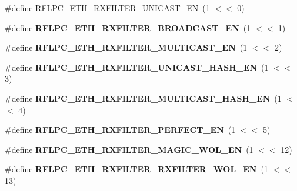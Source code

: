 \begin{DoxyCompactItemize}
\item 
\#define \hyperlink{group__eth_gac3ecd67e6b6b684239e341481ec36584}{R\-F\-L\-P\-C\-\_\-\-E\-T\-H\-\_\-\-R\-X\-F\-I\-L\-T\-E\-R\-\_\-\-U\-N\-I\-C\-A\-S\-T\-\_\-\-E\-N}~(1 $<$$<$ 0)
\item 
\hypertarget{group__eth_ga5e414e2d92196860d74a5349574362d1}{\#define {\bfseries R\-F\-L\-P\-C\-\_\-\-E\-T\-H\-\_\-\-R\-X\-F\-I\-L\-T\-E\-R\-\_\-\-B\-R\-O\-A\-D\-C\-A\-S\-T\-\_\-\-E\-N}~(1 $<$$<$ 1)}\label{group__eth_ga5e414e2d92196860d74a5349574362d1}

\item 
\hypertarget{group__eth_ga0adeccaba7cb9a75c9b79175c0e6c64e}{\#define {\bfseries R\-F\-L\-P\-C\-\_\-\-E\-T\-H\-\_\-\-R\-X\-F\-I\-L\-T\-E\-R\-\_\-\-M\-U\-L\-T\-I\-C\-A\-S\-T\-\_\-\-E\-N}~(1 $<$$<$ 2)}\label{group__eth_ga0adeccaba7cb9a75c9b79175c0e6c64e}

\item 
\hypertarget{group__eth_ga9234646da71dbef8ffdefcd6bbef48dd}{\#define {\bfseries R\-F\-L\-P\-C\-\_\-\-E\-T\-H\-\_\-\-R\-X\-F\-I\-L\-T\-E\-R\-\_\-\-U\-N\-I\-C\-A\-S\-T\-\_\-\-H\-A\-S\-H\-\_\-\-E\-N}~(1 $<$$<$ 3)}\label{group__eth_ga9234646da71dbef8ffdefcd6bbef48dd}

\item 
\hypertarget{group__eth_gab28e59a7ad7b7f29ae109b6690ad7ac9}{\#define {\bfseries R\-F\-L\-P\-C\-\_\-\-E\-T\-H\-\_\-\-R\-X\-F\-I\-L\-T\-E\-R\-\_\-\-M\-U\-L\-T\-I\-C\-A\-S\-T\-\_\-\-H\-A\-S\-H\-\_\-\-E\-N}~(1 $<$$<$ 4)}\label{group__eth_gab28e59a7ad7b7f29ae109b6690ad7ac9}

\item 
\hypertarget{group__eth_gac8a57f58a6bcd2990b21f931badb925f}{\#define {\bfseries R\-F\-L\-P\-C\-\_\-\-E\-T\-H\-\_\-\-R\-X\-F\-I\-L\-T\-E\-R\-\_\-\-P\-E\-R\-F\-E\-C\-T\-\_\-\-E\-N}~(1 $<$$<$ 5)}\label{group__eth_gac8a57f58a6bcd2990b21f931badb925f}

\item 
\hypertarget{group__eth_ga4d4363c80a0ef534743be34f12ad2432}{\#define {\bfseries R\-F\-L\-P\-C\-\_\-\-E\-T\-H\-\_\-\-R\-X\-F\-I\-L\-T\-E\-R\-\_\-\-M\-A\-G\-I\-C\-\_\-\-W\-O\-L\-\_\-\-E\-N}~(1 $<$$<$ 12)}\label{group__eth_ga4d4363c80a0ef534743be34f12ad2432}

\item 
\hypertarget{group__eth_gaa93a63f943f0bd393e06f9ee938a2069}{\#define {\bfseries R\-F\-L\-P\-C\-\_\-\-E\-T\-H\-\_\-\-R\-X\-F\-I\-L\-T\-E\-R\-\_\-\-R\-X\-F\-I\-L\-T\-E\-R\-\_\-\-W\-O\-L\-\_\-\-E\-N}~(1 $<$$<$ 13)}\label{group__eth_gaa93a63f943f0bd393e06f9ee938a2069}

\end{DoxyCompactItemize}
